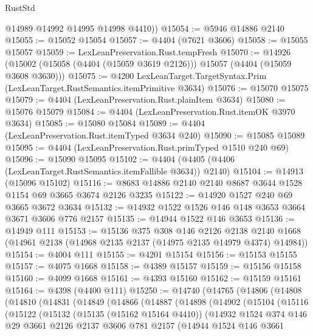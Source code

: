 \begin{lexlean}{RustStd}
\begin{coremodule}
{\begin{coremodule}
{{{{{{{{{{{{{{{{        @14989
        @14992
        @14995
        @14998
        @4410))
@15054 := @5946 @14886 @2140
@15055 := @15052 @15054
@15057 := @4404 (@7621 @3606)
@15058 := @15055 @15057
@15059 := LexLeanPreservation.Rust.tempFresh
@15070 := @14926 (@15002 (@15058 (@4404 (@15059 @3619 @2126))) @15057 (@4404 (@15059 @3608 @3630)))
@15075 := @4200 LexLeanTarget.TargetSyntax.Prim (LexLeanTarget.RustSemantics.itemPrimitive @3634)
@15076 := @15070 @15075
@15079 := @4404 (LexLeanPreservation.Rust.plainItem @3634)
@15080 := @15076 @15079
@15084 := @4404 (LexLeanPreservation.Rust.itemOK @3970 @3634)
@15085 := @15080 @15084
@15089 := @4404 (LexLeanPreservation.Rust.itemTyped @3634 @240)
@15090 := @15085 @15089
@15095 := @4404 (LexLeanPreservation.Rust.primTyped @1510 @240 @69)
@15096 := @15090 @15095
@15102 := @4404 (@4405 (@4406 (LexLeanTarget.RustSemantics.itemFallible @3634)) @2140)
@15104 := @14913 (@15096 @15102)
@15116 := @8683 @14886 @2140 @2140 @8687 @3644 @1528 @1154 @69 @3665 @3674 @2126 @3235
@15122 := @14920 @1527 @240 @69 @3665 @3672 @3634
@15132 := @14932 @1522 @1526 @146 @148 @3653 @3664 @3671 @3606 @776 @2157
@15135 := @14944 @1522 @146 @3653
@15136 := @14949 @111
@15153 := @15136
    @375
    @308
    @146
    @2126
    @2138
    @2140
    @1668
    (@14961 @2138 (@14968 @2135 @2137 (@14975 @2135 @14979 @4374) @14984))
@15154 := @4004 @111
@15155 := @4201 @15154
@15156 := @15153 @15155
@15157 := @4075 @1668
@15158 := @4389 @15157
@15159 := @15156 @15158
@15160 := @4099 @1668
@15161 := @4393 @15160
@15162 := @15159 @15161
@15164 := @4398 (@4400 @111)
@15250 := @14740
    (@14765
      (@14806
        (@14808
          (@14810
            (@14831
              (@14849
                (@14866
                  (@14887
                    (@14898
                      (@14902
                        (@15104
                          (@15116
                            (@15122
                              (@15132
                                (@15135 (@15162 @15164 @4410))
                                (@14932
                                  @1524
                                  @374
                                  @146
                                  @29
                                  @3661
                                  @2126
                                  @2137
                                  @3606
                                  @781
                                  @2157
                                  (@14944
                                    @1524
                                    @146
                                    @3661
}}}}}}}}}}}}}}}}
\end{coremodule}}
\end{coremodule}
\end{lexlean}
